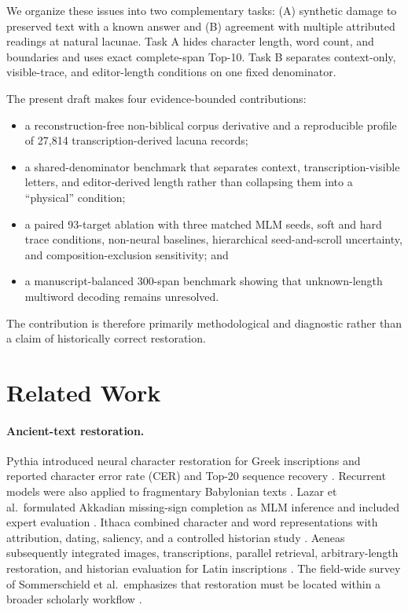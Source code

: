 \documentclass[10pt,twocolumn,a4paper]{article}
\begin{document}
We organize these issues into two complementary tasks: (A) synthetic damage to preserved text with a known answer and (B) agreement with multiple attributed readings at natural lacunae. Task A hides character length, word count, and boundaries and uses exact complete-span Top-10. Task B separates context-only, visible-trace, and editor-length conditions on one fixed denominator.

The present draft makes four evidence-bounded contributions:

\begin{itemize}
  \item a reconstruction-free non-biblical corpus derivative and a reproducible profile of 27,814 transcription-derived lacuna records;
  \item a shared-denominator benchmark that separates context, transcription-visible letters, and editor-derived length rather than collapsing them into a ``physical'' condition;
  \item a paired 93-target ablation with three matched MLM seeds, soft and hard trace conditions, non-neural baselines, hierarchical seed-and-scroll uncertainty, and composition-exclusion sensitivity; and
  \item a manuscript-balanced 300-span benchmark showing that unknown-length multiword decoding remains unresolved.
\end{itemize}

The contribution is therefore primarily methodological and diagnostic rather than a claim of historically correct restoration.

\section{Related Work}

\paragraph{Ancient-text restoration.}
Pythia introduced neural character restoration for Greek inscriptions and reported character error rate (CER) and Top-20 sequence recovery \cite{assael2019}. Recurrent models were also applied to fragmentary Babylonian texts \cite{fetaya2020}. Lazar et al.\ formulated Akkadian missing-sign completion as MLM inference and included expert evaluation \cite{lazar2021}. Ithaca combined character and word representations with attribution, dating, saliency, and a controlled historian study \cite{assael2022}. Aeneas subsequently integrated images, transcriptions, parallel retrieval, arbitrary-length restoration, and historian evaluation for Latin inscriptions \cite{assael2025}. The field-wide survey of Sommerschield et al.\ emphasizes that restoration must be located within a broader scholarly workflow \cite{sommerschield2023}.
\end{document}
